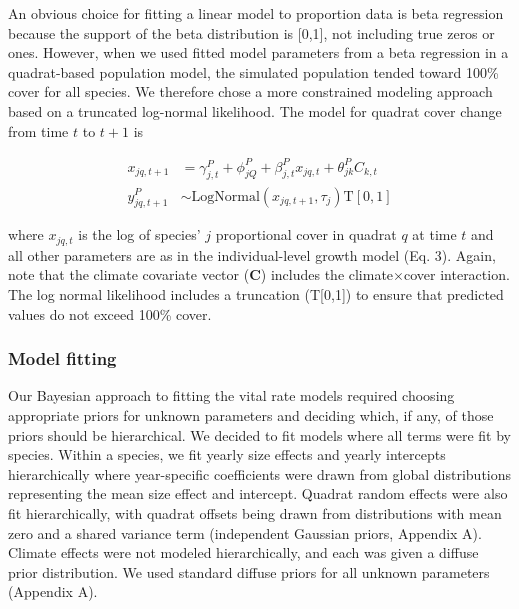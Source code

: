 \documentclass[12pt,]{article}
\begin{document}
An obvious choice for fitting a linear model to proportion data is beta
regression because the support of the beta distribution is {[}0,1{]},
not including true zeros or ones. However, when we used fitted model
parameters from a beta regression in a quadrat-based population model,
the simulated population tended toward 100\% cover for all species. We
therefore chose a more constrained modeling approach based on a
truncated log-normal likelihood. The model for quadrat cover change from
time \(t\) to \(t+1\) is

\begin{align}
x_{jq,t+1} &= \gamma^{P}_{j,t} + \phi^{P}_{jQ} + \beta^{P}_{j,t}x_{jq,t} + \theta^{P}_{jk}C_{k,t} \\
y^{P}_{jq,t+1} &\sim \text{LogNormal}(x_{jq,t+1}, \tau_{j}) \text{T}[0,1]
\end{align}

where \(x_{jq,t}\) is the log of species' \(j\) proportional cover in
quadrat \(q\) at time \(t\) and all other parameters are as in the
individual-level growth model (Eq. 3). Again, note that the climate
covariate vector (\textbf{C}) includes the climate\(\times\)cover
interaction. The log normal likelihood includes a truncation
(T{[}0,1{]}) to ensure that predicted values do not exceed 100\% cover.

\subsubsection{Model fitting}\label{model-fitting}

Our Bayesian approach to fitting the vital rate models required choosing
appropriate priors for unknown parameters and deciding which, if any, of
those priors should be hierarchical. We decided to fit models where all
terms were fit by species. Within a species, we fit yearly size effects
and yearly intercepts hierarchically where year-specific coefficients
were drawn from global distributions representing the mean size effect
and intercept. Quadrat random effects were also fit hierarchically, with
quadrat offsets being drawn from distributions with mean zero and a
shared variance term (independent Gaussian priors, Appendix A). Climate
effects were not modeled hierarchically, and each was given a diffuse
prior distribution. We used standard diffuse priors for all unknown
parameters (Appendix A).
\end{document}
